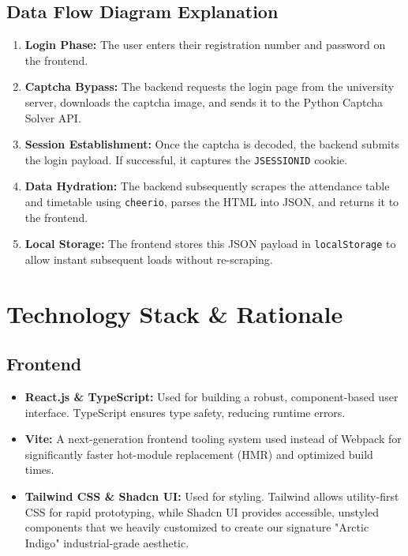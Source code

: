\documentclass[11pt,a4paper]{article}
\begin{document}
\subsection{Data Flow Diagram Explanation}
\begin{enumerate}
    \item \textbf{Login Phase:} The user enters their registration number and password on the frontend.
    \item \textbf{Captcha Bypass:} The backend requests the login page from the university server, downloads the captcha image, and sends it to the Python Captcha Solver API.
    \item \textbf{Session Establishment:} Once the captcha is decoded, the backend submits the login payload. If successful, it captures the \texttt{JSESSIONID} cookie.
    \item \textbf{Data Hydration:} The backend subsequently scrapes the attendance table and timetable using \texttt{cheerio}, parses the HTML into JSON, and returns it to the frontend.
    \item \textbf{Local Storage:} The frontend stores this JSON payload in \texttt{localStorage} to allow instant subsequent loads without re-scraping.
\end{enumerate}

\section{Technology Stack \& Rationale}

\subsection{Frontend}
\begin{itemize}
    \item \textbf{React.js \& TypeScript:} Used for building a robust, component-based user interface. TypeScript ensures type safety, reducing runtime errors.
    \item \textbf{Vite:} A next-generation frontend tooling system used instead of Webpack for significantly faster hot-module replacement (HMR) and optimized build times.
    \item \textbf{Tailwind CSS \& Shadcn UI:} Used for styling. Tailwind allows utility-first CSS for rapid prototyping, while Shadcn UI provides accessible, unstyled components that we heavily customized to create our signature "Arctic Indigo" industrial-grade aesthetic.
\end{itemize}
\end{document}
